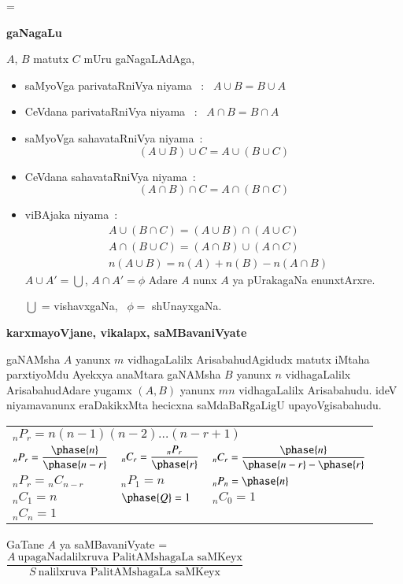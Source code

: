 \noindent
{} = 

\begin{center}
{\large\bf gaNagaLu \ \ }
\end{center}

\noindent
$A$, $B$ matutx $C$ mUru gaNagaLAdAga,
\begin{itemize}
\item[\eng{(i)}] saMyoVga parivataRniVya niyama \ : \ $A\cup B = B \cup A$

\item[\eng{(ii)}] CeVdana parivataRniVya niyama \ : \ $A\cap B = B\cap A$

\item[\eng{(iii)}] saMyoVga sahavataRniVya niyama~:
$$
(A\cup B)\cup C=A\cup (B\cup C)
$$

\item[\eng{(iv)}] CeVdana sahavataRniVya niyama~:
$$
(A\cap B)\cap C=A\cap (B\cap C)
$$

\item[\eng{(v)}] viBAjaka niyama~:
\begin{align*}
& A\cup (B\cap C)=(A\cup B)\cap (A\cup C)\\[2pt]
& A\cap (B\cup C)=(A\cap B)\cup (A\cap C)\\[2pt]
& n(A\cup B)=n(A)+n(B)-n(A\cap B)
\end{align*}
$A\cup A'=\bigcup$, $A\cap A'=\phi$ Adare $A$ nunx $A$ ya pUrakagaNa enunxtArxre.

$\bigcup$ = vishavxgaNa, \ $\phi=$ shUnayxgaNa.
\end{itemize}

\begin{center}
{\large\bf karxmayoVjane, vikalapx, saMBavaniVyate}
\smallskip

{\large\bf {}}
\end{center}

gaNAMsha $A$ yanunx $m$ vidhagaLalilx ArisabahudAgidudx matutx iMtaha parxtiyoMdu Ayekxya anaMtara gaNAMsha $B$ yanunx $n$ vidhagaLalilx ArisabahudAdare yugamx $(A,B)$ yanunx $mn$ vidhagaLalilx Arisabahudu. ideV niyamavanunx eraDakikxMta hecicxna saMdaBaRgaLigU upayoVgisabahudu.
\begin{center}
\renewcommand{\arraystretch}{1.4}
\begin{tabular}{l@{\qquad}l@{\qquad}l}
\multicolumn{3}{l}{${}_{n}P_{r} = n(n-1)(n-2)\ldots (n-r+1)$}\\
$_{n}P_{r}=\dfrac{\phase{n}}{\phase{n-r}}$ & $_{n}C_{r}=\dfrac{_{n}P_{r}}{\phase{r}}$ & $_{n}C_{r}=\dfrac{\phase{n}}{\phase{n-r}-\phase{r}}$\\
$_{n}P_{r}={}_{n}C_{n-r}$ & $_{n}P_{1}=n$ & ${}_{n}P_{n}=\phase{n}$\\
$_{n}C_{1}=n$ & $\phase{Q}=1$ & ${}_{n}C_{0}=1$\\
$_{n}C_{n}=1$ & &
\end{tabular}
\end{center}
GaTane $A$ ya saMBavaniVyate = $\dfrac{A~\text{upagaNadalilxruva PalitAMshagaLa saMKeyx}}{S~\text{nalilxruva PalitAMshagaLa saMKeyx}}$
\smallskip

